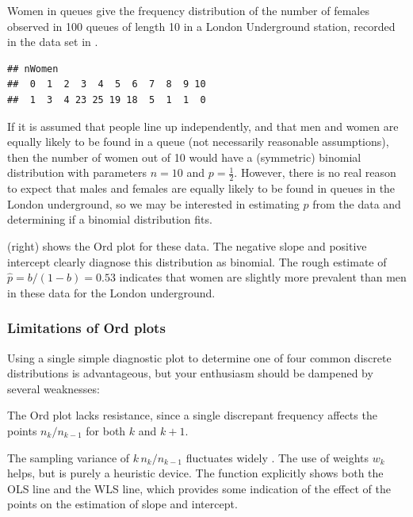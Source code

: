 \documentclass[11pt]{book}
\renewenvironment{knitrout}{\small\renewcommand{\baselinestretch}{.85}}{} %
\begin{document}
\begin{Example}[queues]{Women in queues}
\citet{JinkinsonSlater:81,HoaglinTukey:85}
give the frequency distribution of the number of females observed in 100
queues of length 10 in a London Underground station, recorded
in the data set  in .
\begin{knitrout}
\color{fgcolor}\begin{kframe}
\begin{alltt}
 \hlstd{=}\hlstd{)}
\end{alltt}
\begin{verbatim}
## nWomen
##  0  1  2  3  4  5  6  7  8  9 10 
##  1  3  4 23 25 19 18  5  1  1  0
\end{verbatim}
\end{kframe}
\end{knitrout}

If it is assumed that people line up independently, and that
men and women are equally likely to be found in a queue
(not necessarily reasonable assumptions),
then the number of women out of 10
would have a (symmetric) binomial distribution with parameters $n=10$ and
$p=\frac12$.
However, there is no real reason to expect that males and females are
equally likely to be found in queues in the London underground,
so we may be interested in estimating $p$ from the data
and determining if a binomial distribution fits.

 (right) shows the Ord plot for these data.
The negative slope and positive intercept clearly diagnose this distribution
as binomial.  The rough estimate of $\hat{p} = b/(1-b) = 0.53$ indicates that
women are slightly more prevalent than men in these data for the London 
underground. 
\end{Example}

\subsubsection{Limitations of Ord plots}
Using a single simple diagnostic plot to determine one of four common discrete
distributions is advantageous, but your enthusiasm should be
dampened by several weaknesses:

\begin{itemize*}
\item The Ord plot lacks resistance, since a single discrepant
       frequency affects the points $n_k / n_{k-1}$
       for both \(k\) and \(k  +  1\).

\item The sampling variance of \(k \,  n_k /  n_{k-1}\) fluctuates
       widely
       \citep{HoaglinTukey:85,JinkinsonSlater:81}.  
       The use of weights \(w_k\) helps, but is purely a
       heuristic device. The  function explicitly shows both
       the OLS line and the WLS line, which provides some indication of the
       effect of the points on the estimation of slope and intercept.
\end{itemize*}
\end{document}
